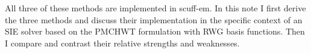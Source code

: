 All three of these methods are implemented in {\sc scuff-em}. In this
note I first derive the three methods and discuss their implementation
in the specific context of an SIE solver based on the PMCHWT formulation
with RWG basis functions. Then I compare and contrast their
relative strengths and weaknesses.
